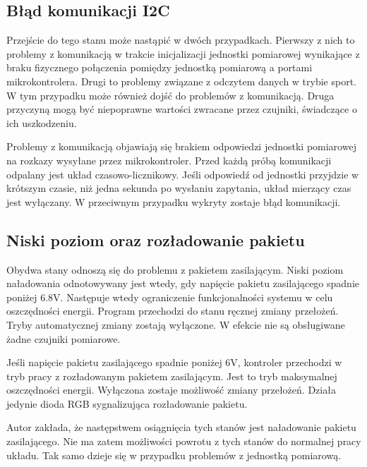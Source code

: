 \subsection{Błąd komunikacji I2C}
Przejście do tego stanu może nastąpić w dwóch przypadkach. Pierwszy z nich to problemy z komunikacją w trakcie inicjalizacji jednostki pomiarowej wynikające z braku fizycznego połączenia pomiędzy jednostką pomiarową a portami mikrokontrolera. Drugi to problemy związane z odczytem danych w trybie sport. W tym przypadku może również dojść do problemów z komunikacją. Druga przyczyną mogą być niepoprawne wartości zwracane przez czujniki, świadczące o ich uszkodzeniu.

Problemy z komunikacją objawiają się brakiem odpowiedzi jednostki pomiarowej na rozkazy wysyłane przez mikrokontroler. Przed każdą próbą komunikacji odpalany jest układ czasowo-licznikowy. Jeśli odpowiedź od jednostki przyjdzie w krótszym czasie, niż jedna sekunda po wysłaniu zapytania, układ mierzący czas jest wyłączany. W przeciwnym przypadku wykryty zostaje błąd komunikacji.  
\subsection{Niski poziom oraz rozładowanie pakietu}
\label{niskiPoziom}
Obydwa stany odnoszą się do problemu z pakietem zasilającym. Niski poziom naładowania odnotowywany jest wtedy, gdy napięcie pakietu zasilającego spadnie poniżej 6.8V. Następuje wtedy ograniczenie funkcjonalności systemu w celu oszczędności energii. Program przechodzi do stanu ręcznej zmiany przełożeń. Tryby automatycznej zmiany zostają wyłączone. W efekcie nie są obsługiwane żadne czujniki pomiarowe.

Jeśli napięcie pakietu zasilającego spadnie poniżej 6V, kontroler przechodzi w tryb pracy z rozładowanym pakietem zasilającym. Jest to tryb maksymalnej oszczędności energii. Wyłączona zostaje możliwość zmiany przełożeń. Działa jedynie dioda RGB sygnalizująca rozładowanie pakietu.

Autor zakłada, że następstwem osiągnięcia tych stanów jest naładowanie pakietu zasilającego. Nie ma zatem możliwości powrotu z tych stanów do normalnej pracy układu. Tak samo dzieje się w przypadku problemów z jednostką pomiarową.

